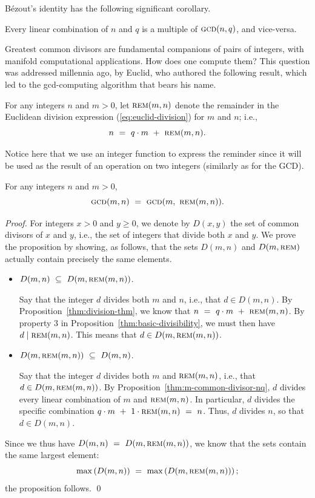 B\'{e}zout's identity has the following significant corollary.

\begin{corol}
Every linear combination of $n$ and $q$ is a multiple of $\mbox{\sc
  gcd}(n,q)$, and vice-versa.
\end{corol}

Greatest common divisors are fundamental companions of pairs of
integers, with manifold computational applications.  How does one
compute them?  This question was addressed millennia ago, by Euclid,
 who authored the following result, which led to the
{\sc gcd}-computing algorithm that bears his name.

For any integers $n$ and $m > 0$, let $\mbox{\sc rem}(m,n)$ denote the
remainder in the Euclidean division expression (\ref{eq:euclid-division})
for $m$ and $n$; i.e.,
\[ n \ = \ q \cdot m \ + \ \mbox{\sc rem}(m,n). \]
\smallskip

Notice here that we use an integer function to express the reminder
since it will be used as the result of an operation on two integers (similarly as for the GCD).

\begin{prop}
\label{thm:gcd-basis}
For any integers $n$ and $m > 0$,
\[ \mbox{\sc gcd}(m,n) \ = \  \mbox{\sc gcd}(m, \ \mbox{\sc rem}(m,n)) . \]
\end{prop}

\begin{proof}
For integers $x > 0$ and $y \geq 0$, we denote by $D(x,y)$ the set of
common divisors of $x$ and $y$, i.e., the set of integers that divide
both $x$ and $y$.  We prove the proposition by showing, as follows,
that the sets $D(m, n)$ and $D(m, \mbox{\sc rem})$ actually contain
precisely the same elements.
\begin{itemize}
\item 
$D(m, n) \ \subseteq \ D(m, \mbox{\sc rem}(m,n))$.

Say that the integer $d$ divides both $m$ and $n$, i.e., that $d \in
D(m,n)$.  By Proposition~\ref{thm:division-thm}, we know that $n \ =
\ q \cdot m \ + \ \mbox{\sc rem}(m,n)$.  By property 3 in
Proposition~\ref{thm:basic-divisibility}, we must then have $d \mid
\mbox{\sc rem}(m,n)$.  This means that $d \in D(m, \mbox{\sc rem}(m,n))$.

\item 
$D(m, \mbox{\sc rem}(m,n)) \ \subseteq \ D(m,n)$.

Say that the integer $d$ divides both $m$ and $\mbox{\sc rem}(m,n)$,
i.e., that $d \in D(m, \mbox{\sc rem}(m,n))$.  By
Proposition~\ref{thm:m-common-divisor-nq}, $d$ divides every linear
combination of $m$ and $\mbox{\sc rem}(m,n)$.  In particular, $d$
divides the specific combination $q \cdot m \ + \ 1 \cdot \mbox{\sc rem}(m,n) \ = \ n$.  Thus,
$d$ divides $n$, so that $d \in D(m,n)$.
\end{itemize}
Since we thus have $D(m, n) \ = \ D(m, \mbox{\sc rem}(m,n))$, we know
that the sets contain the same largest element:
\[ \max\left( D(m, n) \right) \ = \ \max\left( D(m, \mbox{\sc
  rem}(m,n)) \right);
\]
the proposition follows.
\qed
\end{proof}


